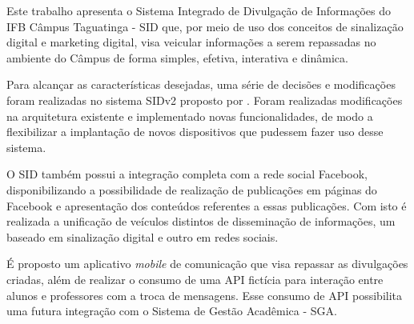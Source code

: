 \begin{resumo}
Este trabalho apresenta o Sistema Integrado de Divulgação de Informações do IFB Câmpus Taguatinga - SID que, por meio de uso dos conceitos de sinalização digital e marketing digital, visa veicular informações a serem repassadas no ambiente do Câmpus de forma simples, efetiva, interativa e dinâmica.

Para alcançar as  características desejadas, uma série de decisões e modificações foram realizadas no sistema SIDv2 proposto por \cite{sobrinho2017}. Foram realizadas modificações na arquitetura existente e implementado novas funcionalidades, de modo a flexibilizar a implantação de novos dispositivos que pudessem fazer uso desse sistema. 

O SID também possui a integração completa com a rede social Facebook, disponibilizando a possibilidade de realização de publicações em páginas do Facebook e apresentação dos conteúdos referentes a essas publicações. Com isto é realizada a unificação de veículos distintos de disseminação de informações, um baseado em sinalização digital e outro em redes sociais.

É proposto um aplicativo \textit{mobile} de comunicação que visa repassar as divulgações criadas, além de realizar o consumo de uma API fictícia para interação entre alunos e professores com a troca de mensagens. Esse consumo de API possibilita uma futura integração com o Sistema de Gestão Acadêmica - SGA.
 \vspace{\onelineskip}
    
 \noindent
\end{resumo}
